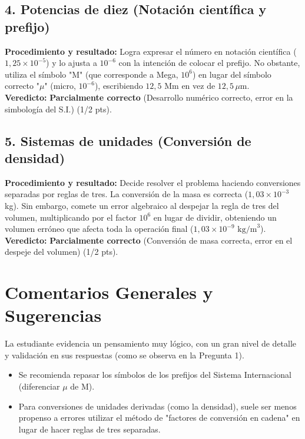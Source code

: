 \documentclass[12pt]{article}
\begin{document}
\subsection*{4. Potencias de diez (Notación científica y prefijo)}
\textbf{Procedimiento y resultado:} Logra expresar el número en notación científica ($1,25 \times 10^{-5}$) y lo ajusta a $10^{-6}$ con la intención de colocar el prefijo. No obstante, utiliza el símbolo "M" (que corresponde a Mega, $10^6$) en lugar del símbolo correcto "$\mu$" (micro, $10^{-6}$), escribiendo $12,5$ Mm en vez de $12,5\,\mu$m. \\
\textbf{Veredicto:} \textbf{Parcialmente correcto} (Desarrollo numérico correcto, error en la simbología del S.I.) (1/2 pts).

\subsection*{5. Sistemas de unidades (Conversión de densidad)}
\textbf{Procedimiento y resultado:} Decide resolver el problema haciendo conversiones separadas por reglas de tres. La conversión de la masa es correcta ($1,03 \times 10^{-3}$ kg). Sin embargo, comete un error algebraico al despejar la regla de tres del volumen, multiplicando por el factor $10^6$ en lugar de dividir, obteniendo un volumen erróneo que afecta toda la operación final ($1,03 \times 10^{-9} \text{ kg/m}^3$). \\
\textbf{Veredicto:} \textbf{Parcialmente correcto} (Conversión de masa correcta, error en el despeje del volumen) (1/2 pts).

\vspace{0.5cm}
\section*{Comentarios Generales y Sugerencias}
La estudiante evidencia un pensamiento muy lógico, con un gran nivel de detalle y validación en sus respuestas (como se observa en la Pregunta 1). 
\begin{itemize}
    \item Se recomienda repasar los símbolos de los prefijos del Sistema Internacional (diferenciar $\mu$ de M).
    \item Para conversiones de unidades derivadas (como la densidad), suele ser menos propenso a errores utilizar el método de "factores de conversión en cadena" en lugar de hacer reglas de tres separadas.
\end{itemize}
\end{document}

